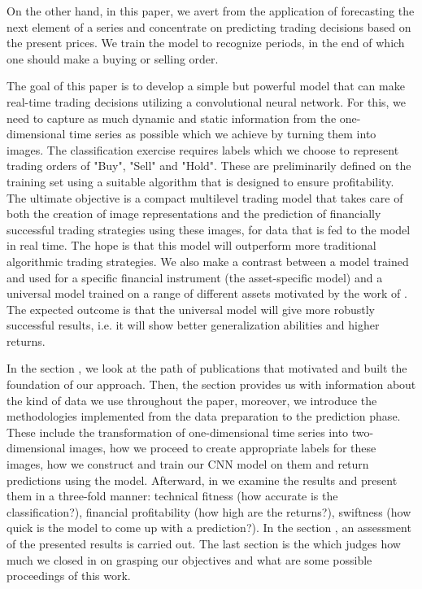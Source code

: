 \documentclass[11pt, a4paper]{article}
\begin{document}
On the other hand, in this paper, we avert from the application of forecasting the next element of a series and concentrate on predicting trading decisions based on the present prices. We train the model to recognize periods, in the end of which one should make a buying or selling order. 

The goal of this paper is to develop a simple but powerful model that can make real-time trading decisions utilizing a convolutional neural network. For this, we need to capture as much dynamic 
and static information from the one-dimensional time series as possible which we achieve by turning them into images. The classification exercise requires labels which we choose to represent trading orders of "Buy", "Sell" and "Hold". 
These are preliminarily defined on the training set using a suitable algorithm that is designed to ensure profitability. The ultimate objective is a compact multilevel trading model that takes care of both the creation of image representations and the prediction of financially successful trading strategies using these images, for data that is fed to the model in real time. The hope is that this model will outperform more traditional algorithmic trading strategies. We also make a contrast between a model trained and used for a specific financial instrument (the asset-specific model) and a universal model trained on a range of different assets motivated by the work of \cite{sirignano2018universal}. The expected outcome is that the universal model will give more robustly successful results, i.e. it will show better generalization abilities and higher returns. 

In the section , we look at the path of publications that motivated and built the foundation of our approach. Then, the section  provides us with information about the kind of data we use throughout 
the paper, moreover, we introduce the methodologies implemented from the data preparation to the prediction phase. These include the transformation of one-dimensional time series into two-dimensional images, 
how we proceed to create appropriate labels for these images, how we construct and train our CNN model on them and return predictions using the model. 
Afterward, in  we examine the results and present them in a three-fold manner:
technical fitness (how accurate is the classification?), financial profitability (how high are the returns?), swiftness (how quick is the model to come up with a prediction?). In the section , an assessment of the presented results is carried out.
The last section is the  which judges how much 
we closed in on grasping our objectives and what are some possible proceedings of this work.
\end{document}

